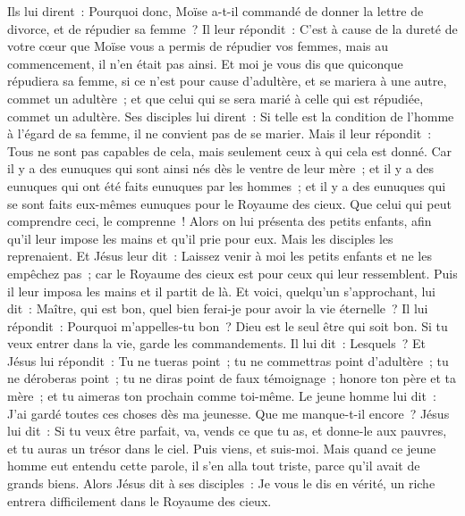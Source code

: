 \begin{multicols}{2}
Ils lui dirent~: Pourquoi donc, Moïse a-t-il commandé de donner la lettre de divorce, et de répudier sa femme~?
Il leur répondit~: C'est à cause de la dureté de votre cœur que Moïse vous a permis de répudier vos femmes, mais au commencement, il n'en était pas ainsi.
Et moi je vous dis que quiconque répudiera sa femme, si ce n'est pour cause d'adultère, et se mariera à une autre, commet un adultère~; et que celui qui se sera marié à celle qui est répudiée, commet un adultère.
Ses disciples lui dirent~: Si telle est la condition de l'homme à l'égard de sa femme, il ne convient pas de se marier.
Mais il leur répondit~: Tous ne sont pas capables de cela, mais seulement ceux à qui cela est donné.
Car il y a des eunuques qui sont ainsi nés dès le ventre de leur mère~; et il y a des eunuques qui ont été faits eunuques par les hommes~; et il y a des eunuques qui se sont faits eux-mêmes eunuques pour le Royaume des cieux. Que celui qui peut comprendre ceci, le comprenne~!
Alors on lui présenta des petits enfants, afin qu'il leur impose les mains et qu'il prie pour eux. Mais les disciples les reprenaient.
Et Jésus leur dit~: Laissez venir à moi les petits enfants et ne les empêchez pas~; car le Royaume des cieux est pour ceux qui leur ressemblent.
Puis il leur imposa les mains et il partit de là.
Et voici, quelqu'un s'approchant, lui dit~: Maître, qui est bon, quel bien ferai-je pour avoir la vie éternelle~?
Il lui répondit~: Pourquoi m'appelles-tu bon~? Dieu est le seul être qui soit bon. Si tu veux entrer dans la vie, garde les commandements.
Il lui dit~: Lesquels~? Et Jésus lui répondit~: Tu ne tueras point~; tu ne commettras point d'adultère~; tu ne déroberas point~; tu ne diras point de faux témoignage~;
honore ton père et ta mère~; et tu aimeras ton prochain comme toi-même.
Le jeune homme lui dit~: J'ai gardé toutes ces choses dès ma jeunesse. Que me manque-t-il encore~?
Jésus lui dit~: Si tu veux être parfait, va, vends ce que tu as, et donne-le aux pauvres, et tu auras un trésor dans le ciel. Puis viens, et suis-moi.
Mais quand ce jeune homme eut entendu cette parole, il s'en alla tout triste, parce qu'il avait de grands biens.
Alors Jésus dit à ses disciples~: Je vous le dis en vérité, un riche entrera difficilement dans le Royaume des cieux.

\end{multicols}

